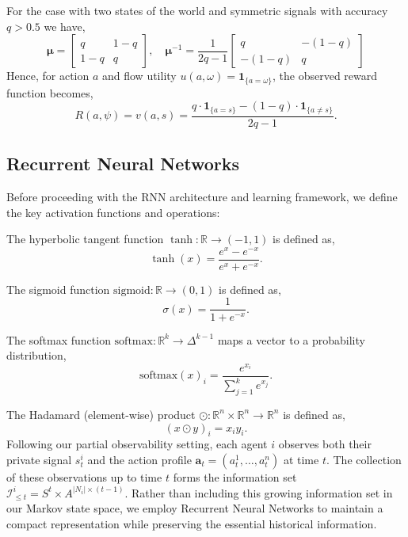 For the case with two states of the world and symmetric signals with accuracy $q > 0.5$ we have,
\begin{equation*}
    \bm{\mu} = \begin{bmatrix} q & 1 - q \\ 1 - q & q \end{bmatrix}, \quad \bm{\mu}^{-1} = \frac{1}{2q - 1} \begin{bmatrix} q & -(1 - q) \\ -(1 - q) & q \end{bmatrix}
\end{equation*}
Hence, for action $a$ and flow utility $u(a, \omega) = \mathbf{1}_{\{a = \omega\}}$, the observed reward function becomes,
\begin{equation*}
    R(a, \psi) = v(a, s) = \frac{q \cdot \mathbf{1}_{\{a = s\}} - (1 - q) \cdot \mathbf{1}_{\{a \neq s\}}}{2q - 1}.
\end{equation*}

\subsection*{Recurrent Neural Networks}
Before proceeding with the RNN architecture and learning framework, we define the key activation functions and operations:

The hyperbolic tangent function $\tanh: \mathbb{R} \to (-1,1)$ is defined as,
\[
    \tanh(x) = \frac{e^x - e^{-x}}{e^x + e^{-x}}.
\]

The sigmoid function $\text{sigmoid} : \mathbb{R} \to (0,1)$ is defined as,
\[
    \sigma(x) = \frac{1}{1 + e^{-x}}.
\]

The softmax function $\text{softmax}: \mathbb{R}^k \to \Delta^{k-1}$ maps a vector to a probability distribution,
\[
    \text{softmax}(x)_i = \frac{e^{x_i}}{\sum_{j=1}^k e^{x_j}}.
\]

The Hadamard (element-wise) product $\odot: \mathbb{R}^n \times \mathbb{R}^n \to \mathbb{R}^n$ is defined as,
\[
    (x \odot y)_i = x_i y_i.
\]
Following our partial observability setting, each agent $i$ observes both their private signal $s^i_t$ and the action profile $\mathbf{a}_t = (a^1_t, \ldots, a^n_t)$ at time $t$. The collection of these observations up to time $t$ forms the information set $\mathcal{I}^i_{\leq t} = S^t \times A^{|N_i|×(t-1)}$. Rather than including this growing information set in our Markov state space, we employ Recurrent Neural Networks to maintain a compact representation while preserving the essential historical information.

